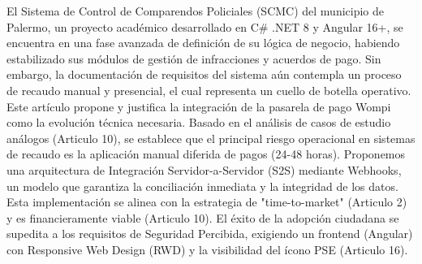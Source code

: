 El Sistema de Control de Comparendos Policiales (SCMC) del municipio de Palermo, un proyecto académico desarrollado en C\# .NET 8 y Angular 16+, se encuentra en una fase avanzada de definición de su lógica de negocio, habiendo estabilizado sus módulos de gestión de infracciones y acuerdos de pago. Sin embargo, la documentación de requisitos del sistema aún contempla un proceso de recaudo manual y presencial, el cual representa un cuello de botella operativo. Este artículo propone y justifica la integración de la pasarela de pago Wompi como la evolución técnica necesaria. Basado en el análisis de casos de estudio análogos (Articulo 10), se establece que el principal riesgo operacional en sistemas de recaudo es la aplicación manual diferida de pagos (24-48 horas). Proponemos una arquitectura de Integración Servidor-a-Servidor (S2S) mediante Webhooks, un modelo que garantiza la conciliación inmediata y la integridad de los datos. Esta implementación se alinea con la estrategia de "time-to-market" (Articulo 2) y es financieramente viable (Articulo 10). El éxito de la adopción ciudadana se supedita a los requisitos de Seguridad Percibida, exigiendo un frontend (Angular) con Responsive Web Design (RWD) y la visibilidad del ícono PSE (Articulo 16).